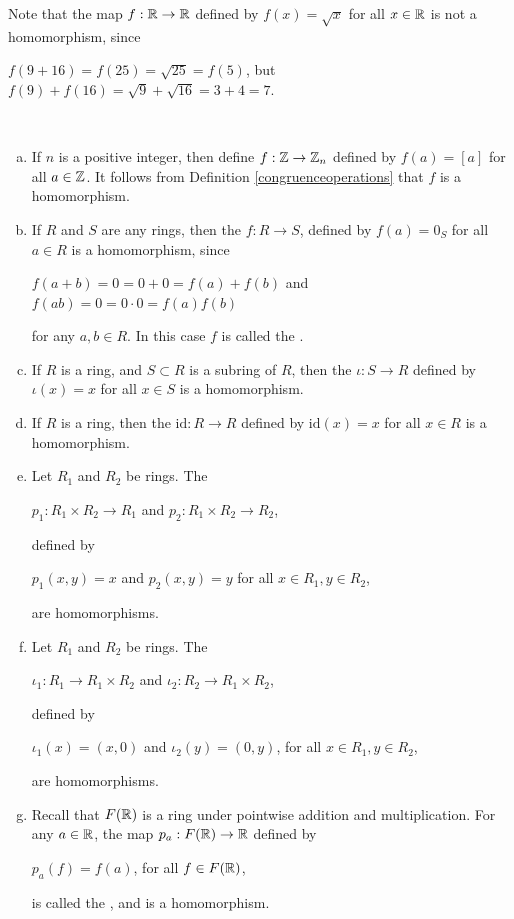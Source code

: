 \documentclass[11pt,fleqn,dvipsnames,usenames]{article}
\newcommand{\p}{\noindent}
\begin{document}
%
\p Note that the map $f:\mathbb{R}\to\mathbb{R}$ defined by $f(x) = \sqrt{x}$ for all $x\in\mathbb{R}$ is not a homomorphism, since
\begin{center}
$f(9 + 16) = f(25) = \sqrt{25} = f(5)$, but $f(9) + f(16) = \sqrt{9} + \sqrt{16} = 3 + 4 = 7$.
\end{center}
%
\begin{examples}\label{homomorphismexamples}~
\begin{enumerate}[(a)]
\item If $n$ is a positive integer, then define $f:\mathbb{Z}\to\mathbb{Z}_{n}$ defined by $f(a) = [a]$ for all $a\in\mathbb{Z}$.  It follows from Definition \ref{congruenceoperations} that $f$ is a homomorphism.
\item If $R$ and $S$ are any rings, then the  $f:R\to S$, defined by $f(a) = 0_{S}$ for all $a\in R$ is a homomorphism, since
\begin{center}
$f(a + b) = 0 = 0 + 0 = f(a) + f(b)$ and $f(ab) = 0 = 0\cdot 0 = f(a)f(b)$
\end{center}
for any $a,b\in R$.  In this case $f$ is called the .
\item If $R$ is a ring, and $S\subset R$ is a subring of $R$, then the  $\iota:S\to R$ defined by $\iota(x) = x$ for all $x\in S$ is a homomorphism.
\item If $R$ is a ring, then the  $\text{id}:R\to R$ defined by $\text{id}(x) = x$ for all $x\in R$ is a homomorphism.
\item Let $R_1$ and $R_2$ be rings.  The 
\begin{center}
$p_{1}:R_1\times R_2\to R_1$ and $p_2:R_1\times R_2\to R_2$,
\end{center}
defined by
\begin{center}
$p_1(x,y) = x$ and $p_2(x,y) = y$ for all $x\in R_1,y\in R_2$,
\end{center}
are homomorphisms.
\item Let $R_1$ and $R_2$ be rings.  The 
\begin{center}
$\iota_1:R_1\to R_1\times R_2$ and $\iota_2:R_2\to R_1\times R_2$,
\end{center}
defined by
\begin{center}
$\iota_1(x) = (x,0)$ and $\iota_2(y) = (0,y)$, for all $x\in R_1,y\in R_2$,
\end{center}
are homomorphisms.
\item Recall that $F(\mathbb{R})$ is a ring under pointwise addition and multiplication.  For any $a\in \mathbb{R}$, the map $p_{a}:F(\mathbb{R})\to \mathbb{R}$ defined by
\begin{center}
$p_a(f) = f(a)$, for all $f\in F(\mathbb{R})$,
\end{center}
is called the , and is a homomorphism.
\end{enumerate}
\end{examples}
\end{document}
